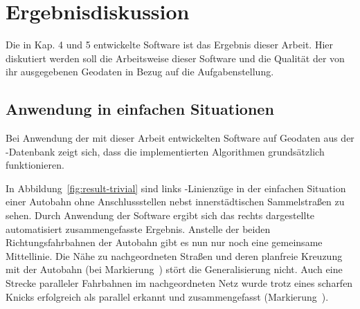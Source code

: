 \documentclass[../main/thesis.tex]{subfiles}
\begin{document}
\chapter{Ergebnisdiskussion}

Die in Kap. 4 und 5 entwickelte Software ist das Ergebnis dieser Arbeit. Hier diskutiert werden soll die Arbeitsweise dieser Software und die Qualität der von ihr ausgegebenen Geodaten in Bezug auf die Aufgabenstellung.




\section{Anwendung in einfachen Situationen}

Bei Anwendung der mit dieser Arbeit entwickelten Software auf Geodaten aus der \osm-Datenbank zeigt sich, dass die implementierten Algorithmen grundsätzlich funktionieren.


In Abbildung~\ref{fig:result-trivial} sind links \osm-Linienzüge in der einfachen Situation einer Autobahn ohne Anschlussstellen nebst innerstädtischen Sammelstraßen zu sehen.
Durch Anwendung der Software ergibt sich das rechts dargestellte automatisiert zusammengefasste Ergebnis.
Anstelle der beiden Richtungsfahrbahnen der Autobahn gibt es nun nur noch eine gemeinsame Mittellinie.
Die Nähe zu nachgeordneten Straßen und deren planfreie Kreuzung mit der Autobahn (bei Markierung~) stört die Generalisierung nicht.
Auch eine Strecke paralleler Fahrbahnen im nachgeordneten Netz wurde trotz eines scharfen Knicks erfolgreich als parallel erkannt und zusammengefasst (Markierung~).
\end{document}
